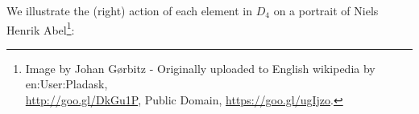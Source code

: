 \documentclass[../algebraNotesMSRI-UP2016.tex]{subfiles}
\begin{document}
\begin{frame}
We illustrate the (right) action of each element in $D_4$ on a portrait of Niels Henrik Abel\footnote{\tiny Image by Johan G\o rbitz - Originally uploaded to English wikipedia by en:User:Pladask,\\ \url{http://goo.gl/DkGu1P}, Public Domain, \url{https://goo.gl/ugIjzo}.
}:

\smallGap
{}
\end{frame}
\end{document}
